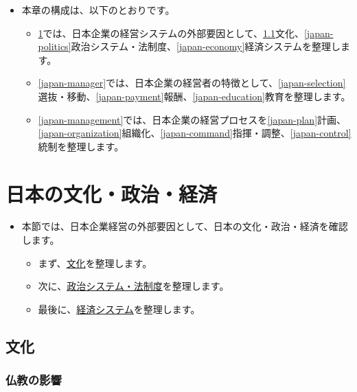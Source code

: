 \documentclass[
]{book}
\begin{document}
\begin{itemize}
\item
  本章の構成は、以下のとおりです。

  \begin{itemize}
  \item
    \ref{japan-external}では、日本企業の経営システムの外部要因として、\ref{japan-culture}文化、\ref{japan-politics}政治システム・法制度、\ref{japan-economy}経済システムを整理します。
  \item
    \ref{japan-manager}では、日本企業の経営者の特徴として、\ref{japan-selection}選抜・移動、\ref{japan-payment}報酬、\ref{japan-education}教育を整理します。
  \item
    \ref{japan-management}では、日本企業の経営プロセスを\ref{japan-plan}計画、\ref{japan-organization}組織化、\ref{japan-command}指揮・調整、\ref{japan-control}統制を整理します。
  \end{itemize}
\end{itemize}

\hypertarget{japan-external}{%
\section{日本の文化・政治・経済}\label{japan-external}}

\begin{itemize}
\item
  本節では、日本企業経営の外部要因として、日本の文化・政治・経済を確認します。

  \begin{itemize}
  \item
    まず、\protect\hyperlink{japan-culture}{文化}を整理します。
  \item
    次に、\protect\hyperlink{japan-politics}{政治システム・法制度}を整理します。
  \item
    最後に、\protect\hyperlink{japan-economy}{経済システム}を整理します。
  \end{itemize}
\end{itemize}

\hypertarget{japan-culture}{%
\subsection{文化}\label{japan-culture}}

\hypertarget{ux4ecfux6559ux306eux5f71ux97ff}{%
\subsubsection{仏教の影響}\label{ux4ecfux6559ux306eux5f71ux97ff}}
\end{document}

